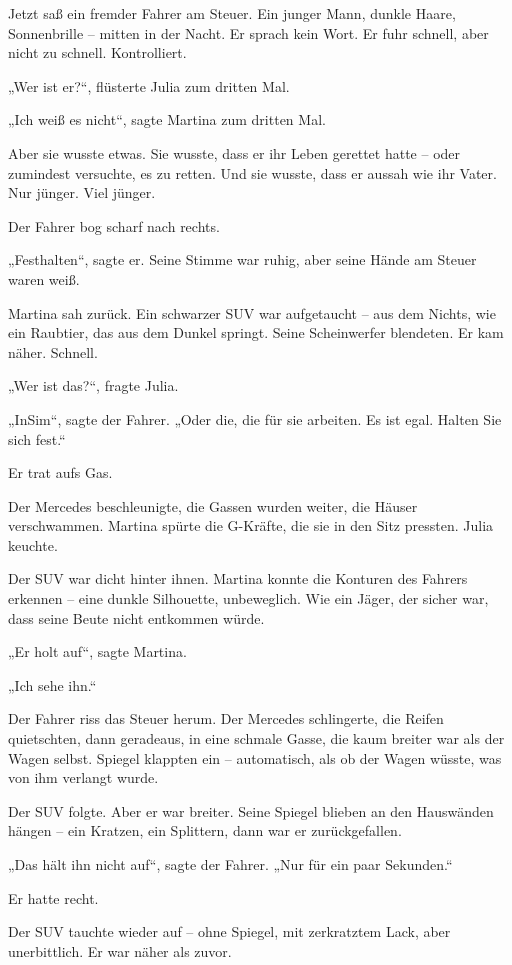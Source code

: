 \documentclass[
]{article}
\begin{document}
Jetzt saß ein fremder Fahrer am Steuer. Ein junger Mann, dunkle Haare, Sonnenbrille -- mitten in der Nacht. Er sprach kein Wort. Er fuhr schnell, aber nicht zu schnell. Kontrolliert.

„Wer ist er?{\kern0pt}``, flüsterte Julia zum dritten Mal.

„Ich weiß es nicht``, sagte Martina zum dritten Mal.

Aber sie wusste etwas. Sie wusste, dass er ihr Leben gerettet hatte -- oder zumindest versuchte, es zu retten. Und sie wusste, dass er aussah wie ihr Vater. Nur jünger. Viel jünger.

Der Fahrer bog scharf nach rechts.

„Festhalten``, sagte er. Seine Stimme war ruhig, aber seine Hände am Steuer waren weiß.

Martina sah zurück. Ein schwarzer SUV war aufgetaucht -- aus dem Nichts, wie ein Raubtier, das aus dem Dunkel springt. Seine Scheinwerfer blendeten. Er kam näher. Schnell.

„Wer ist das?{\kern0pt}``, fragte Julia.

„InSim``, sagte der Fahrer. „Oder die, die für sie arbeiten. Es ist egal. Halten Sie sich fest.``

Er trat aufs Gas.

Der Mercedes beschleunigte, die Gassen wurden weiter, die Häuser verschwammen. Martina spürte die G-Kräfte, die sie in den Sitz pressten. Julia keuchte.

Der SUV war dicht hinter ihnen. Martina konnte die Konturen des Fahrers erkennen -- eine dunkle Silhouette, unbeweglich. Wie ein Jäger, der sicher war, dass seine Beute nicht entkommen würde.

„Er holt auf``, sagte Martina.

„Ich sehe ihn.``

Der Fahrer riss das Steuer herum. Der Mercedes schlingerte, die Reifen quietschten, dann geradeaus, in eine schmale Gasse, die kaum breiter war als der Wagen selbst. Spiegel klappten ein -- automatisch, als ob der Wagen wüsste, was von ihm verlangt wurde.

Der SUV folgte. Aber er war breiter. Seine Spiegel blieben an den Hauswänden hängen -- ein Kratzen, ein Splittern, dann war er zurückgefallen.

„Das hält ihn nicht auf``, sagte der Fahrer. „Nur für ein paar Sekunden.``

Er hatte recht.

Der SUV tauchte wieder auf -- ohne Spiegel, mit zerkratztem Lack, aber unerbittlich. Er war näher als zuvor.
\end{document}
